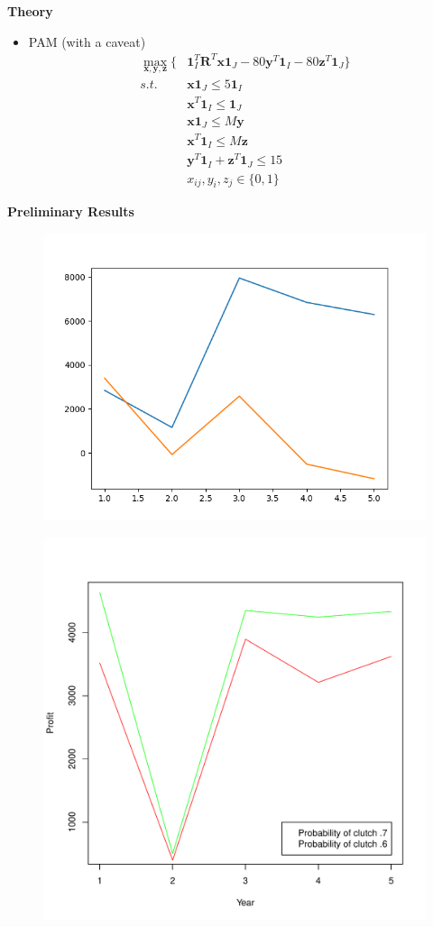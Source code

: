 \documentclass[grey,handout]{beamer}
\renewcommand{\frametitle}[1]{\begin{center}\textbf{#1}\end{center}}
\begin{document}
\begin{frame}
  \frametitle{Theory}
  \begin{itemize}
    \item PAM (with a caveat)
    \begin{align*}
      \max_{\mathbf{x},\mathbf{y},\mathbf{z}}\{ &\mathbf 1_I^T\mathbf R^T\mathbf{x}\mathbf 1_J - 80\mathbf y^T\mathbf 1_I - 80\mathbf z^T\mathbf 1_J \}\\
      s.t. \quad& \mathbf x\mathbf 1_J \leq 5\mathbf 1_I \\
      & \mathbf x^T \mathbf 1_I \leq \mathbf1_J\\
      & \mathbf x \mathbf1_J\leq M\mathbf y\\
      & \mathbf x^T\mathbf 1_I \leq M\mathbf z\\
      & \mathbf y^T\mathbf 1_I + \mathbf z^T\mathbf 1_J \leq 15\\
      & x_{ij}, y_i, z_j \in \{0,1\}
    \end{align*}
  \end{itemize}
\end{frame}


\begin{frame}
  \frametitle{Preliminary Results}
  \begin{multicols}{2}
    \begin{figure}[H]
    \centering
    \includegraphics[width=.5\textwidth]{Figure_1.png}
    \end{figure}
    
    \begin{figure}[H]
    \centering
    \includegraphics[width=.5\textwidth]{prelimcompstat.pdf}
    \end{figure}
    \end{multicols}

\end{frame}
\end{document}
